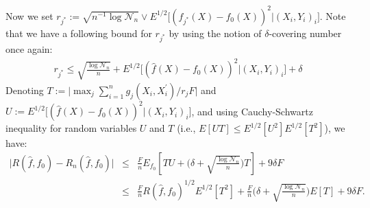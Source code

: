 \documentclass{article}
\theoremstyle{definition}
\begin{document}
Now we set $r_{j^*}:=\sqrt{n^{-1}\log{\mathcal{N}_n}} \vee E^{1/2} \big[ ( f_{j^*}(X)-f_0(X) )^{2} | (X_{i},Y_{i})_{i}\big]$. Note that we have a following bound for $r_{j^*}$ by using the notion of $\delta$-covering number once again:
\begin{eqnarray*}
    r_{j^*} \leq \sqrt{\frac{\log{\mathcal{N}_n}}{n}} + E^{1/2} \bigg[ ( \widehat{f}(X)-f_0(X) )^{2} \big| (X_{i},Y_{i})_{i} \bigg] + \delta
\end{eqnarray*}
Denoting $T:=\big| \max_{j} \sum_{i=1}^{n} g_{j}(X_i,X_i^{'})/{r_{j}F} \big|$ and $U:=E^{1/2} \big[ ( \widehat{f}(X)-f_0(X) )^{2} | (X_{i},Y_{i})_{i} \big]$, and using Cauchy-Schwartz inequality for random variables $U$ and $T$ (i.e., $E[UT]\leq E^{1/2}[U^{2}]E^{1/2}[T^{2}]$), we have:
\begin{eqnarray} \label{eq:eq1}
    \bigg| R(\widehat{f},f_{0})-R_n(\widehat{f},f_{0}) \bigg| &\leq& 
    \frac{F}{n} E_{f_0} \left[ TU + \bigg( \delta + \sqrt{\frac{\log{\mathcal{N}_n}}{n}} \bigg) T\right]  + 9\delta F \nonumber \\
    &\leq& \frac{F}{n}R(\widehat{f},f_{0})^{1/2}E^{1/2}[T^{2}] + \frac{F}{n}\bigg( \delta + \sqrt{\frac{\log{\mathcal{N}_n}}{n}} \bigg) E[T] + 9\delta F.
\end{eqnarray}
\end{document}
